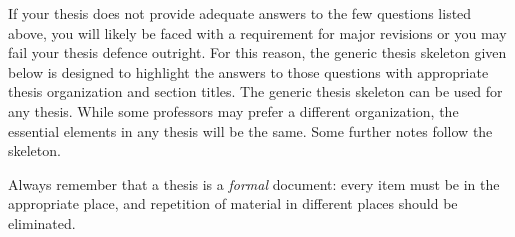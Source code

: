 If your thesis does not provide adequate answers to the few questions listed above, you will likely be faced with a requirement for major revisions or you may fail your thesis defence outright. For this reason, the generic thesis skeleton given below is designed to highlight the answers to those questions with appropriate thesis organization and section titles. The generic thesis skeleton can be used for any thesis. While some professors may prefer a different organization, the essential elements in any thesis will be the same. Some further notes follow the skeleton.

Always remember that a thesis is a \emph{formal} document: every item must be in the appropriate place, and repetition of material in different places should be eliminated. 